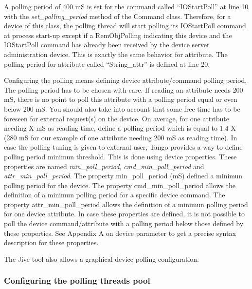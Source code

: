 A polling period of 400 mS is set for the command called ``IOStartPoll''
at line 10 with the \emph{set\_polling\_period} method of the Command
class. Therefore, for a device of this class, the polling thread will
start polling its IOStartPoll command at process start-up except if
a RemObjPolling indicating this device and the IOStartPoll command
has already been received by the device server administration device.
This is exactly the same behavior for attribute. The polling period
for attribute called ``String\_attr'' is defined at line 20.

Configuring the polling means defining device attribute/command polling
period. The polling period has to be chosen with care. If reading
an attribute needs 200 mS, there is no point to poll this attribute
with a polling period equal or even below 200 mS. You should also
take into account that some \textquotedbl{}free\textquotedbl{} time
has to be foreseen for external request(s) on the device. On average,
for one attribute needing X mS as reading time, define a polling period
which is equal to 1.4 X (280 mS for our example of one attribute needing
200 mS as reading time). In case the polling tuning is given to external
user, Tango provides a way to define polling period minimun threshold.
This is done using device properties. These properties are named \emph{min\_poll\_period},
\emph{cmd\_min\_poll\_period} and \emph{attr\_min\_poll\_period}.
The property min\_poll\_period (mS) defined
a minimun polling period for the device. The property cmd\_min\_poll\_period
allows the definition of a minimun polling period for a specific device
command. The property attr\_min\_poll\_period
allows the definition of a minimun polling period for one device attribute.
In case these properties are defined, it is not possible to poll the
device command/attribute with a polling period below those defined
by these properties. See Appendix A on device parameter to get a precise
syntax description for these properties.

The Jive\cite{Jive doc} tool also allows a graphical device polling
configuration.

\subsubsection{Configuring the polling threads pool}

